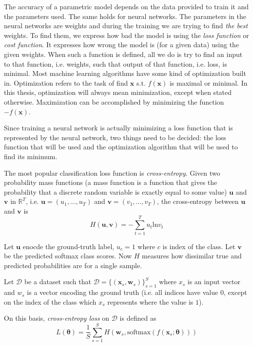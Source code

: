 The accuracy of a parametric model depends on the data provided to train it and the parameters used. The same holds for neural networks. The parameters in the neural networks are weights and during the training we are trying to find \textit{the best} weights. To find them, we express how bad the model is using the \textit{loss function} or \textit{cost function}. It expresses how wrong the model is (for a given data) using the given weights. When such a function is defined, all we do is try to find an input to that function, i.e. weights, such that output of that function, i.e. loss, is minimal. Most machine learning algorithms have some kind of optimization built in. Optimization refers to the task of find $\pmb x$ s.t. $f(\pmb x)$ is maximal or minimal. In this thesis, optimization will always mean minimization, except when stated otherwise. Maximization can be accomplished by minimizing the function $-f(\pmb x)$.

Since training a neural network is actually minimizing a loss function that is represented by the neural network, two things need to be decided: the loss function that will be used and the optimization algorithm that will be used to find its minimum.

The most popular classification loss function is \textit{cross-entropy}. Given two probability mass functions (a mass function is a function that gives the probability that a discrete random variable is exactly equal to some value) $\pmb u$ and $\pmb v$ in $\mathbb{R}^T$, i.e. $\pmb u = (u_1, ..., u_T)$ and $\pmb v =  (v_1, ..., v_T)$, the cross-entropy between $\pmb u$ and $\pmb v$ is
 \begin{equation}
H (\pmb u, \pmb v)= - \sum_{t=1}^T  u_t  \text{ln} v_t 
\end{equation}

Let $\pmb u$ enocde the ground-truth label, $u_c = 1$ where $c$ is index of the class. Let $\pmb v$ be the predicted softmax class scores. Now $H$ measures how dissimilar true and predicted probabilities are for a single sample.

Let $\mathcal{D}$ be a dataset such that
$ \mathcal{D} = \{ (\pmb x_s, \pmb w_s)\}_{s=1}^{S}$ where $x_s$ is an input vector and $w_s$ is a vector encoding the ground truth (i.e. all indices have value $0$, except on the index of the class which $x_s$ represents where the value is $1$).

On this basis, \textit{cross-entropy loss} on $\mathcal{D}$ is defined as
\begin{equation} \label{eq:loss-function}
L(\pmb \theta) = \frac{1}{S} \sum_{s=1}^{S} H (\pmb w_s, \text{softmax} (f(\pmb x_s ; \pmb \theta)))
\end{equation}

